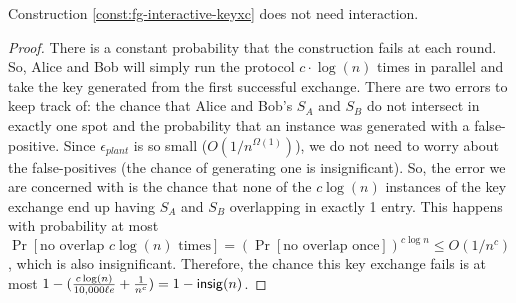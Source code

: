 \begin{lemma}\label{lem:non-interactive-const}
	Construction \ref{const:fg-interactive-keyxc} does not need interaction.
\end{lemma}
\begin{proof}
	There is a constant probability that the construction fails at each round. So, Alice and Bob will simply run the protocol $c\cdot\log(n)$ times in parallel and take the key generated from the first successful exchange. There are two errors to keep track of: the chance that Alice and Bob's $S_A$ and $S_B$ do not intersect in exactly one spot and the probability that an instance was generated with a false-positive. Since $\epsilon_{plant}$ is so small ($O(1/n^{\Omega(1)})$), we do not need to worry about the false-positives (the chance of generating one is insignificant). So, the error we are concerned with is the chance that none of the $c \log(n)$ instances of the key exchange end up having $S_A$ and $S_B$ overlapping in exactly 1 entry. This happens with probability at most $\Pr[\mbox{no overlap } c\log(n) \mbox{ times}] = \left( \Pr[\mbox{no overlap once}] \right)^{c \log n} \leq O(1/n^c)$, which is also insignificant. Therefore, the chance this key exchange fails is at most $1 - (\frac{c\log(n)}{10,000 \ell e} + \frac{1}{n^c}) = 1 - \mathsf{insig}(n)$.
\end{proof}

